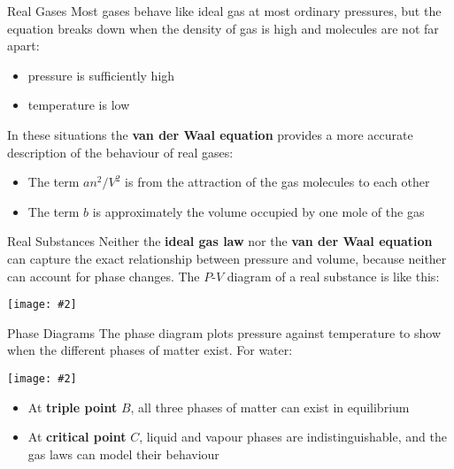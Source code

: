 \documentclass[12pt,aspectratio=169]{beamer}
\newcommand{\pic}[2]{\texttt{[image: \#2]}}
\newcommand{\eq}[2]{\vspace{#1}{\Large\begin{displaymath}#2\end{displaymath}}}
\begin{document}
\begin{frame}{Real Gases}
  Most gases behave like ideal gas at most ordinary pressures, but the
  equation breaks down when the density of gas is high and molecules are not
  far apart:
  \begin{itemize}
  \item pressure is sufficiently high
  \item temperature is low
  \end{itemize}
  In these situations the \textbf{van der Waal equation} provides a more
  accurate description of the behaviour of real gases:

  \eq{-.2in}{
    \boxed{\left(P+\frac{an^2}{V^2}\right)(V-bn)=nRT}
  }

  \begin{itemize}
  \item The term $an^2/V^2$ is from the attraction of the gas molecules to each
    other
  \item The term $b$ is approximately the volume occupied by one mole of the gas
  \end{itemize}
\end{frame}



\begin{frame}{Real Substances}
  Neither the \textbf{ideal gas law} nor the \textbf{van der Waal equation}
  can capture the exact relationship between pressure and volume, because
  neither can account for phase changes. The $P$-$V$ diagram of a real substance
  is like this:
  \begin{center}
    \pic{.35}{realsubstance.png}
  \end{center}
\end{frame}



\begin{frame}{Phase Diagrams}
  The phase diagram plots pressure against temperature to show when the
  different phases of matter exist. For water:
  \begin{center}
    \pic{.4}{10-figure-31.png}
  \end{center}
  \begin{itemize}
  \item\vspace{-.1in} At \textbf{triple point} $B$, all three phases of matter
    can exist in equilibrium
  \item At \textbf{critical point} $C$, liquid and vapour phases are
    indistinguishable, and the gas laws can model their behaviour
  \end{itemize}
\end{frame}
\end{document}
